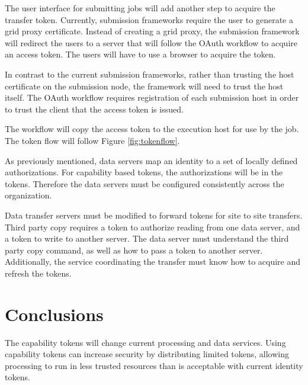 \documentclass{webofc}
\begin{document}
The user interface for submitting jobs will add another step to acquire the transfer token.  Currently, submission frameworks require the user to generate a grid proxy certificate.  Instead of creating a grid proxy, the submission framework will redirect the users to a server that will follow the OAuth workflow to acquire an access token.  The users will have to use a browser to acquire the token.

In contrast to the current submission frameworks, rather than trusting the host certificate on the submission node, the framework will need to trust the host itself.  The OAuth workflow requires registration of each submission host in order to trust the client that the access token is issued. 

The workflow will copy the access token to the execution host for use by the job.  The token flow will follow Figure \ref{fig:tokenflow}.

As previously mentioned, data servers map an identity to a set of locally defined authorizations.  For capability based tokens, the authorizations will be in the tokens.  Therefore the data servers must be configured consistently across the organization.

Data transfer servers must be modified to forward tokens for site to site transfers.  Third party copy requires a token to authorize reading from one data server, and a token to write to another server.  The data server must understand the third party copy command, as well as how to pass a token to another server.  Additionally, the service coordinating the transfer must know how to acquire and refresh the tokens.


\section{Conclusions}
\label{sec:conclusion}

The capability tokens will change current processing and data services.  Using capability tokens can increase security by distributing limited tokens, allowing processing to run in less trusted resources than is acceptable with current identity tokens.


%

\end{document}
